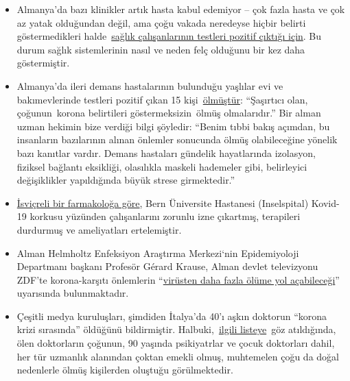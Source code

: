 \begin{itemize}
\tightlist
\item
  Almanya'da bazı klinikler artık hasta kabul edemiyor -- çok fazla
  hasta ve çok az yatak olduğundan değil, ama çoğu vakada neredeyse
  hiçbir belirti göstermedikleri
  halde~\href{https://www.sueddeutsche.de/panorama/coronavirus-news-deutschland-wolfsburg-laschet-1.4828033}{sağlık
  çalışanlarının testleri pozitif
  çıktı}\href{https://www.sueddeutsche.de/panorama/coronavirus-news-deutschland-wolfsburg-laschet-1.4828033}{ğı
  için}. Bu durum sağlık sistemlerinin nasıl ve neden felç olduğunu bir
  kez daha göstermiştir.
\item
  Almanya'da ileri demans hastalarının bulunduğu yaşlılar evi ve
  bakımevlerinde testleri pozitif çıkan 15
  kişi~\href{https://www.sueddeutsche.de/panorama/coronavirus-news-deutschland-wolfsburg-laschet-1.4828033}{ölmüştür}:
  ``Şaşırtıcı olan, çoğunun~korona belirtileri göstermeksizin~ölmüş
  olmalarıdır.'' Bir alman uzman hekimin bize verdiği bilgi şöyledir:
  ``Benim tıbbi bakış açımdan, bu insanların bazılarının alınan önlemler
  sonucunda ölmüş olabileceğine yönelik bazı kanıtlar vardır. Demans
  hastaları gündelik hayatlarında izolasyon, fiziksel bağlantı
  eksikliği, olasılıkla maskeli hademeler gibi, belirleyici
  değişiklikler yapıldığında büyük strese girmektedir.''
\item
  \href{https://twitter.com/sneatio/status/1244157986832101376}{İsviçreli
  bir farmakoloğa göre}, Bern Üniversite Hastanesi (Inselspital)
  Kovid-19 korkusu yüzünden çalışanlarını zorunlu izne çıkartmış,
  terapileri durdurmuş ve ameliyatları ertelemiştir.
\item
  Alman Helmholtz Enfeksiyon Araştırma Merkezi`nin Epidemiyoloji
  Departmanı başkanı Profesör Gérard Krause, Alman devlet televizyonu
  ZDF'te korona-karşıtı önlemlerin
  ``\href{https://www.zdf.de/nachrichten/politik/coronavirus-epidemiologe-folgen-helmholtz-100.html}{virüsten
  daha fazla ölüme yol açabileceği}'' uyarısında bulunmaktadır.
\item
  Çeşitli medya kuruluşları, şimdiden İtalya'da 40'ı aşkın doktorun
  ``korona krizi sırasında'' öldüğünü bildirmiştir.
  Halbuki,~\href{https://portale.fnomceo.it/elenco-dei-medici-caduti-nel-corso-dellepidemia-di-covid-19/?ref=drnweb.repubblica.scroll-1}{ilgili
  listeye}~göz atıldığında, ölen doktorların çoğunun, 90 yaşında
  psikiyatrlar ve çocuk doktorları dahil, her tür uzmanlık alanından
  çoktan emekli olmuş, muhtemelen çoğu da doğal nedenlerle ölmüş
  kişilerden oluştuğu görülmektedir.

\end{itemize}
